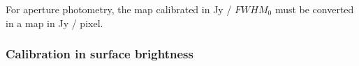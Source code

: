 For aperture photometry, the map calibrated in Jy / $FWHM_{0}$ must be
converted in a map in Jy / pixel. 

\subsubsection{Calibration in surface brightness}





 

%
%
%
